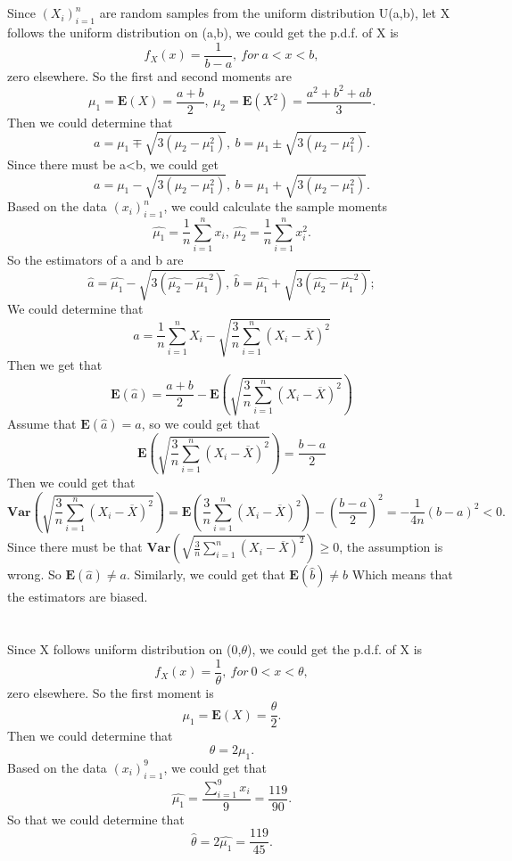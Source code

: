 \documentclass[10.5pt]{article}
\begin{document}
\section{}
Since $(X_i)_{i=1}^n$ are random samples from the uniform distribution U(a,b), let X follows the uniform distribution on (a,b), we could get the p.d.f. of X is $$f_X(x)=\frac{1}{b-a},~for ~a<x<b,$$\indent
zero elsewhere. So the first and second moments are $$\mu_1=\mathbf{E}(X)=\frac{a+b}{2},~\mu_2=\mathbf{E}(X^2)=\frac{a^2+b^2+ab}{3}.$$\indent
Then we could determine that $$a=\mu_1\mp\sqrt{3(\mu_2-\mu_1^2)},~b=\mu_1\pm\sqrt{3(\mu_2-\mu_1^2)}.$$\indent
Since there must be a<b, we could get $$a=\mu_1-\sqrt{3(\mu_2-\mu_1^2)},~b=\mu_1+\sqrt{3(\mu_2-\mu_1^2)}.$$\indent
Based on the data $(x_i)_{i=1}^n$, we could calculate the sample moments $$\hat{\mu_1}=\frac{1}{n}\sum_{i=1}^nx_i,~\hat{\mu_2}=\frac{1}{n}\sum_{i=1}^nx_i^2.$$\indent
So the estimators of a and b are $$\hat{a}=\hat{\mu_1}-\sqrt{3(\hat{\mu_2}-\hat{\mu_1}^2)},~\hat{b}=\hat{\mu_1}+\sqrt{3(\hat{\mu_2}-\hat{\mu_1}^2)};$$\indent
We could determine that $$\hat{a}=\frac{1}{n}\sum_{i=1}^nX_i-\sqrt{\frac{3}{n}\sum_{i=1}^n(X_i-\overline{X})^2}$$\indent
Then we get that $$\mathbf{E}(\hat{a})=\frac{a+b}{2}-\mathbf{E}(\sqrt{\frac{3}{n}\sum_{i=1}^n(X_i-\overline{X})^2})$$\indent
Assume that $\mathbf{E}(\hat{a})=a$, so we could get that $$\mathbf{E}(\sqrt{\frac{3}{n}\sum_{i=1}^n(X_i-\overline{X})^2})=\frac{b-a}{2}$$\indent
Then we could get that $$\mathbf{Var}(\sqrt{\frac{3}{n}\sum_{i=1}^n(X_i-\overline{X})^2})=\mathbf{E}(\frac{3}{n}\sum_{i=1}^n(X_i-\overline{X})^2)-(\frac{b-a}{2})^2=-\frac{1}{4n}(b-a)^2<0.$$\indent
Since there must be that $\mathbf{Var}(\sqrt{\frac{3}{n}\sum_{i=1}^n(X_i-\overline{X})^2})\geqslant 0$, the assumption is wrong. So $\mathbf{E}(\hat{a})\neq a$. Similarly, we could get that $\mathbf{E}(\hat{b})\neq b$ Which means that the estimators are biased.

\section{}
Since X follows uniform distribution on (0,$\theta$), we could get the p.d.f. of X is $$f_X(x)=\frac{1}{\theta},~for ~0<x<\theta,$$\indent
zero elsewhere. So the first moment is $$\mu_1=\mathbf{E}(X)=\frac{\theta}{2}.$$\indent
Then we could determine that $$\theta=2\mu_1.$$\indent
Based on the data $(x_i)_{i=1}^9$, we could get that $$\hat{\mu_1}=\frac{\sum_{i=1}^9x_i}{9}=\frac{119}{90}.$$\indent
So that we could determine that $$\hat{\theta}=2\hat{\mu_1}=\frac{119}{45}.$$\indent
\end{document}

